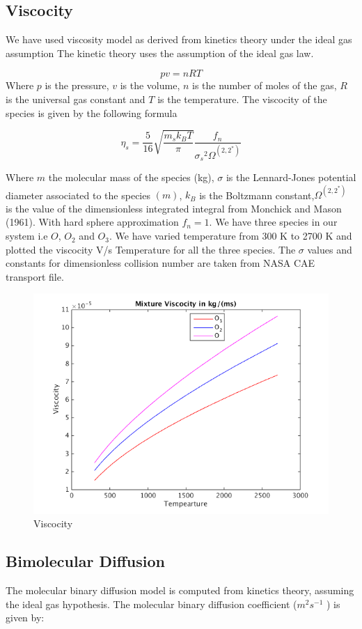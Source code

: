 \subsection{Viscocity}
\noindent We have used viscosity model as derived from kinetics theory under the ideal gas assumption
The kinetic theory uses the assumption of the ideal gas law.
 
$$pv = nRT$$ Where $p$ is the pressure, $v$ is the volume, $n$ is the number of moles of the gas, $R$ is the universal gas constant and $T$ is the temperature. The viscocity of the species is given by the following formula

$$\eta_s = \frac{5}{16}\sqrt{\frac{m_s k_B T}{\pi}}\frac{f_n}{{\sigma_s}^2   \Omega^{(2,2^*)}}$$

\noindent Where  $m$ the molecular mass of the species (kg), $\sigma$ is the Lennard-Jones potential diameter associated
to the species $(m)$, $k_B$ is the Boltzmann constant,$\Omega^{(2,2^*)}$ is the value of the dimensionless integrated integral from Monchick
and Mason (1961). With hard sphere approximation $f_n = 1$. We have three species in our system i.e $O$, $O_2$ and $O_3$. We have varied temperature from 300 K to 2700 K and plotted the viscocity V/s Temperature for all the three species. The $\sigma$ values and constants for dimensionless collision number are taken from NASA CAE transport file. 
\begin{figure}[h!]
  \centering
  \includegraphics[scale=0.5]{viscocity model.png}
   \caption{Viscocity}
\end{figure}

\subsection{Bimolecular Diffusion}
\noindent The molecular binary diffusion model is
computed from kinetics theory, assuming the ideal gas hypothesis. The molecular binary diffusion coefficient ($m^2 s^{-1}$ ) is given by:

